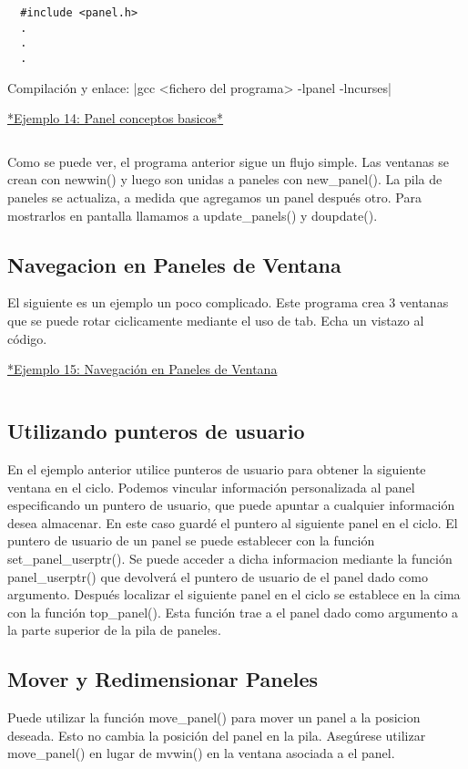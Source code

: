 \documentclass{article}
\begin{document}
\begin{verbatim}
  #include <panel.h>
  .
  .
  .
\end{verbatim}

Compilación y enlace:
|gcc <fichero del programa> -lpanel -lncurses|

\href{https://github.com/nasciiboy/NCURSES-Programming-HOWTO/blob/master/ncurses_programs/panels/panel_simple.c}{*Ejemplo 14: Panel conceptos basicos*}
\inputminted{cpp}{./cpp/014_panel.cpp}

Como se puede ver, el programa anterior sigue un flujo simple. Las ventanas se
crean con newwin() y luego son unidas a paneles con new\_panel(). La pila de
paneles se actualiza, a medida que agregamos un panel después otro. Para
mostrarlos en pantalla llamamos a update\_panels() y doupdate().

\subsection{Navegacion en Paneles de Ventana}%
El siguiente es un ejemplo un poco complicado. Este programa crea 3 ventanas
que se puede rotar ciclicamente mediante el uso de tab. Echa un vistazo al
código.

\href{https://github.com/nasciiboy/NCURSES-Programming-HOWTO/blob/master/ncurses_programs/panels/panel_browse.c}{*Ejemplo 15: Navegación en Paneles de Ventana}
\inputminted{cpp}{./cpp/015_navegacion_paneles.cpp}

\subsection{Utilizando punteros de usuario}%
En el ejemplo anterior utilice punteros de usuario para obtener la siguiente
ventana en el ciclo. Podemos vincular información personalizada al panel
especificando un puntero de usuario, que puede apuntar a cualquier información
desea almacenar. En este caso guardé el puntero al siguiente panel en el ciclo.
El puntero de usuario de un panel se puede establecer con la función
set\_panel\_userptr(). Se puede acceder a dicha informacion mediante la función
panel\_userptr() que devolverá el puntero de usuario de el panel dado como
argumento. Después localizar el siguiente panel en el ciclo se establece en la
cima con la función top\_panel(). Esta función trae a el panel dado como
argumento a la parte superior de la pila de paneles.

\subsection{Mover y Redimensionar Paneles}%
Puede utilizar la función move\_panel() para mover un panel a la posicion
deseada. Esto no cambia la posición del panel en la pila. Asegúrese utilizar
move\_panel() en lugar de mvwin() en la ventana asociada a el panel.\\
\end{document}
